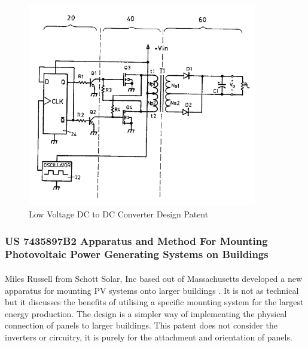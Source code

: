 \begin{figure}[H]
\hfill\includegraphics[width = 100mm]{images/DC_Conv_Patent}\hspace*{\fill}
\caption{Low Voltage DC to DC Converter Design Patent \cite{Hulsey1992}}
\label{fig:DC2DC}
\end{figure}

\subsubsection{US 7435897B2 Apparatus and Method For Mounting Photovoltaic Power Generating Systems on Buildings}

\paragraph{}
Miles Russell from Schott Solar, Inc based out of Massachusetts developed a new apparatus for mounting PV systems onto larger buildings \cite{Russes2002}. It is not as technical but it discusses the benefits of utilising a specific mounting system for the largest energy production. The design is a simpler way of implementing the physical connection of panels to larger buildings. This patent does not consider the inverters or circuitry, it is purely for the attachment and orientation of panels.   
\newpage